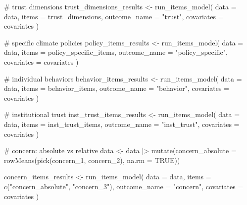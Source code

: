 \documentclass[
  letterpaper,
  DIV=11,
  numbers=noendperiod]{scrartcl}
\newenvironment{Shaded}{\begin{snugshade}}{\end{snugshade}}
\newcommand{\AttributeTok}[1]{\textcolor[rgb]{0.40,0.45,0.13}{#1}}
\newcommand{\CommentTok}[1]{\textcolor[rgb]{0.37,0.37,0.37}{#1}}
\newcommand{\ConstantTok}[1]{\textcolor[rgb]{0.56,0.35,0.01}{#1}}
\newcommand{\FunctionTok}[1]{\textcolor[rgb]{0.28,0.35,0.67}{#1}}
\newcommand{\NormalTok}[1]{\textcolor[rgb]{0.00,0.23,0.31}{#1}}
\newcommand{\OtherTok}[1]{\textcolor[rgb]{0.00,0.23,0.31}{#1}}
\newcommand{\SpecialCharTok}[1]{\textcolor[rgb]{0.37,0.37,0.37}{#1}}
\newcommand{\StringTok}[1]{\textcolor[rgb]{0.13,0.47,0.30}{#1}}
\begin{document}
\begin{Shaded}
\begin{Highlighting}[]
\CommentTok{\# trust dimensions}
\NormalTok{trust\_dimensions\_results }\OtherTok{\textless{}{-}} \FunctionTok{run\_items\_model}\NormalTok{(}
  \AttributeTok{data         =}\NormalTok{ data,}
  \AttributeTok{items        =}\NormalTok{ trust\_dimensions,}
  \AttributeTok{outcome\_name =} \StringTok{"trust"}\NormalTok{,}
  \AttributeTok{covariates   =}\NormalTok{ covariates}
\NormalTok{)}

\CommentTok{\# specific climate policies}
\NormalTok{policy\_items\_results }\OtherTok{\textless{}{-}} \FunctionTok{run\_items\_model}\NormalTok{(}
  \AttributeTok{data         =}\NormalTok{ data,}
  \AttributeTok{items        =}\NormalTok{ policy\_specific\_items,}
  \AttributeTok{outcome\_name =} \StringTok{"policy\_specific"}\NormalTok{,}
  \AttributeTok{covariates   =}\NormalTok{ covariates}
\NormalTok{)}

\CommentTok{\# individual behaviors}
\NormalTok{behavior\_items\_results }\OtherTok{\textless{}{-}} \FunctionTok{run\_items\_model}\NormalTok{(}
  \AttributeTok{data         =}\NormalTok{ data,}
  \AttributeTok{items        =}\NormalTok{ behavior\_items,}
  \AttributeTok{outcome\_name =} \StringTok{"behavior"}\NormalTok{,}
  \AttributeTok{covariates   =}\NormalTok{ covariates}
\NormalTok{)}

\CommentTok{\# institutional trust}
\NormalTok{inst\_trust\_items\_results }\OtherTok{\textless{}{-}} \FunctionTok{run\_items\_model}\NormalTok{(}
  \AttributeTok{data         =}\NormalTok{ data,}
  \AttributeTok{items        =}\NormalTok{ inst\_trust\_items,}
  \AttributeTok{outcome\_name =} \StringTok{"inst\_trust"}\NormalTok{,}
  \AttributeTok{covariates   =}\NormalTok{ covariates}
\NormalTok{)}

\CommentTok{\# concern: absolute vs relative}
\NormalTok{data }\OtherTok{\textless{}{-}}\NormalTok{ data }\SpecialCharTok{|\textgreater{}}
  \FunctionTok{mutate}\NormalTok{(}\AttributeTok{concern\_absolute =} \FunctionTok{rowMeans}\NormalTok{(}\FunctionTok{pick}\NormalTok{(concern\_1, concern\_2), }\AttributeTok{na.rm =} \ConstantTok{TRUE}\NormalTok{))}

\NormalTok{concern\_items\_results }\OtherTok{\textless{}{-}} \FunctionTok{run\_items\_model}\NormalTok{(}
  \AttributeTok{data         =}\NormalTok{ data,}
  \AttributeTok{items        =} \FunctionTok{c}\NormalTok{(}\StringTok{"concern\_absolute"}\NormalTok{, }\StringTok{"concern\_3"}\NormalTok{),}
  \AttributeTok{outcome\_name =} \StringTok{"concern"}\NormalTok{,}
  \AttributeTok{covariates   =}\NormalTok{ covariates}
\NormalTok{)}
\end{Highlighting}
\end{Shaded}
\end{document}
